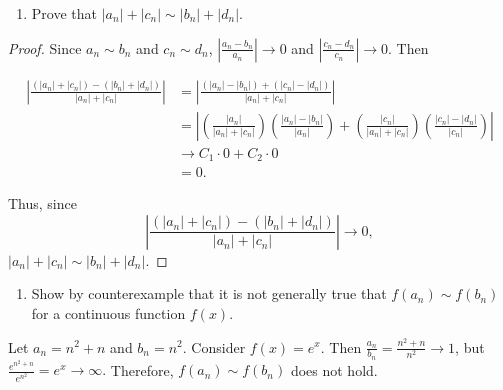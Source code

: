 \documentclass[12pt,]{article}
\providecommand{\tightlist}{%
  \setlength{\itemsep}{0pt}\setlength{\parskip}{0pt}}
\begin{document}
\begin{enumerate}
\def\labelenumi{\alph{enumi}.}
\setcounter{enumi}{2}
\tightlist
\item
  Prove that \(|a_n| + |c_n| \sim |b_n| + |d_n|.\)
\end{enumerate}

\begin{proof}
Since $a_n \sim b_n$ and $c_n \sim d_n$, $\left|\frac{a_n-b_n}{a_n}\right|\rightarrow 0$ and $\left|\frac{c_n-d_n}{c_n}\right|\rightarrow 0$. Then

\begin{align*}
\left|\frac{(|a_n|+|c_n|)-(|b_n|+|d_n|)}{|a_n|+|c_n|}\right| & = \left|\frac{(|a_n|-|b_n|)+(|c_n|-|d_n|)}{|a_n|+|c_n|}\right|\\
& = \left|\left(\frac{|a_n|}{|a_n|+|c_n|}\right)\left(\frac{|a_n|-|b_n|}{|a_n|}\right)+\left(\frac{|c_n|}{|a_n|+|c_n|}\right)\left(\frac{|c_n|-|d_n|}{|c_n|}\right)\right|\\
& \rightarrow C_1\cdot 0 + C_2 \cdot 0\\
& = 0.
\end{align*}

Thus, since $$\left|\frac{(|a_n|+|c_n|)-(|b_n|+|d_n|)}{|a_n|+|c_n|}\right|\rightarrow 0,$$
$|a_n| + |c_n| \sim |b_n| + |d_n|.$
\end{proof}

\begin{enumerate}
\def\labelenumi{\alph{enumi}.}
\setcounter{enumi}{3}
\tightlist
\item
  Show by counterexample that it is not generally true that
  \(f(a_n) \sim f(b_n)\) for a continuous function \(f(x)\).
\end{enumerate}

Let \(a_n = n^2+n\) and \(b_n = n^2\). Consider \(f(x) = e^x.\) Then
\(\frac{a_n}{b_n} = \frac{n^2+n}{n^2}\rightarrow 1\), but
\(\frac{e^{n^2+n}}{e^{n^2}} = e^x \rightarrow \infty.\) Therefore,
\(f(a_n) \sim f(b_n)\) does not hold.
\end{document}
